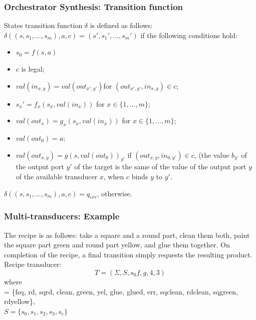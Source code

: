 \documentclass{beamer}
\theoremstyle{definition}
\theoremstyle{plain}
\begin{document}
\begin{frame}
\frametitle{Orchestrator Synthesis: Transition function}
States transition function $\delta$ is defined as follows: \\
$\delta((s, s_{1}, . . .  , s_{m}), a, c) = (s', s_{1}', . . .  , s_{m}')$ if the following conditions hold:
\begin{itemize}
\item $s_{0} = f(s, a)$
\item $c$ is legal;
\item $val(in_{x,y}) = val(out_{x',y'})$for $(out_{x',y'}, in_{x,y}) \in c$;
\item $s_{x}' = f_{x}(s_{x}, val(in_{x})) $ for $ x \in \{1, . . . ,m\}$;
\item $ val(out_{x}) = g_{x}(s_{x}, val(in_{x})) $ for $ x \in \{1, . . . ,m\}$;
\item $val(out_{0}) = a$;
\item $val(out_{x,y}) = g(s, val(out_{0}))_{y'}$ if $(out_{x,y}, in_{0, y'}) \in c$, (the value $b_{y'}$ of the output port $y'$ of the target is the same of the value of the output port $y$ of the available transducer $x$, when $c$ binds $y$ to $y'$.
\end{itemize}
$\delta((s, s_{1}, . . .  , s_{m}), a, c) = q_{err}$, otherwise.
\end{frame}

\begin{frame}
\frametitle{Multi-transducers: Example}
The recipe is as follows: take a square and a round part, clean them both, paint the square part green and round part yellow,
and glue them together. On completion of the recipe, a final transition simply requests the resulting product. Recipe transducer:
$$T = (\Sigma, S, s_{0} f, g, 4, 3)$$
where\\
\Sigma = \{fsq, rd, sqrd, clean, green, yel, glue, glued, err, sqclean, rdclean, sqgreen, rdyellow\},\\
$S = \{s_{0}, s_{1}, s_{2}, s_{3}, s_{e}\}$\\

\end{frame}
\end{document}
